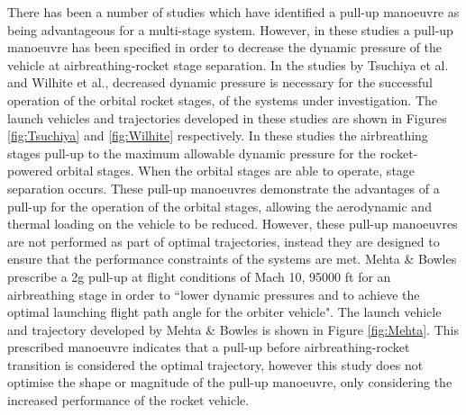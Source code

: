 There has been a number of studies which have identified a pull-up manoeuvre as being advantageous for a multi-stage system\cite{Tsuchiya2005,Wilhite1991,Mehta2001}. However, in these studies a pull-up manoeuvre has been specified in order to decrease the dynamic pressure of the vehicle at airbreathing-rocket stage separation. 
In the studies by Tsuchiya et al.\cite{Tsuchiya2005} and Wilhite et al.\cite{Wilhite1991}, decreased dynamic pressure is necessary for the successful operation of the orbital rocket stages, of the systems under investigation. The launch vehicles and trajectories developed in these studies are shown in Figures \ref{fig:Tsuchiya} and \ref{fig:Wilhite} respectively. In these studies the airbreathing stages pull-up to the maximum allowable dynamic pressure for the rocket-powered orbital stages. When the orbital stages are able to operate, stage separation occurs. These pull-up manoeuvres demonstrate the advantages of a pull-up for the operation of the orbital stages, allowing the aerodynamic and thermal loading on the vehicle to be reduced. However, these pull-up manoeuvres are not performed as part of optimal trajectories, instead they are designed to ensure that the performance constraints of the systems are met. 
Mehta \& Bowles\cite{Mehta2001} prescribe a 2g pull-up at flight conditions of Mach 10, 95000 ft for an airbreathing stage in order to ``lower dynamic pressures and to achieve the optimal launching flight path angle for the orbiter vehicle". The launch vehicle and trajectory developed by Mehta \& Bowles is shown in Figure \ref{fig:Mehta}. This prescribed manoeuvre indicates that a pull-up before airbreathing-rocket transition is considered the optimal trajectory, however this study does not optimise the shape or magnitude of the pull-up manoeuvre, only considering the increased performance of the rocket vehicle. 

